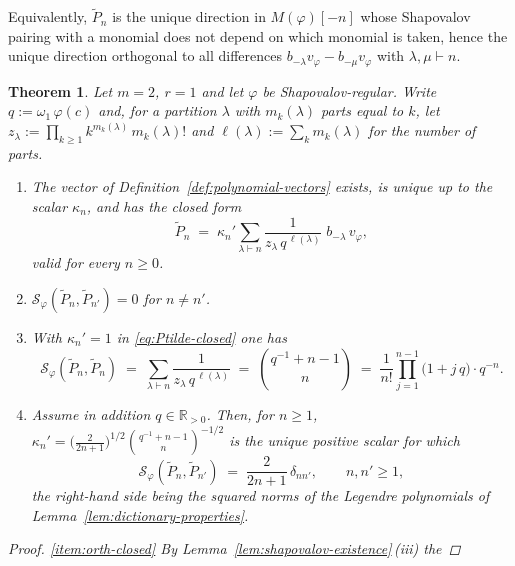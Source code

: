 \documentclass[12pt]{amsart}
\theoremstyle{plain}
\newtheorem{theorem}{Theorem}[section]
\theoremstyle{definition}
\newcommand{\RR}{\mathbb{R}}
\newcommand{\Mf}{M(\varphi)}          %
\newcommand{\Sf}{\mathcal{S}_\varphi} %
\newcommand{\vf}{v_\varphi}           %
\begin{document}
Equivalently, $\tilde{P}_n$ is the unique direction in $\Mf[-n]$ whose
Shapovalov pairing with a monomial does not depend on which monomial is
taken, hence the unique direction orthogonal to all differences
$b_{-\lambda}\vf - b_{-\mu}\vf$ with $\lambda,\mu \vdash n$. 

\begin{theorem}
\label{thm:shapovalov-orthogonality}
Let $m = 2$, $r = 1$ and let $\varphi$ be Shapovalov-regular. Write
$q := \omega_1\,\varphi(c)$ and, for a partition $\lambda$ with $m_k(\lambda)$
parts equal to $k$, let $z_\lambda := \prod_{k\ge 1} k^{m_k(\lambda)}\,m_k(\lambda)!$
and $\ell(\lambda) := \sum_k m_k(\lambda)$ for the number of parts.
\begin{enumerate}[label=\textup{(\roman*)}]
  \item\label{item:orth-closed}
    The vector of Definition~\textup{\ref{def:polynomial-vectors}} exists,
    is unique up to the scalar $\kappa_n$, and has the closed form
    \begin{equation}\label{eq:Ptilde-closed}
      \tilde{P}_n \;=\; \kappa_n' \sum_{\lambda \vdash n}
        \frac{1}{z_\lambda\,q^{\,\ell(\lambda)}}\; b_{-\lambda}\,\vf ,
    \end{equation}
    valid for every $n \geq 0$.
  \item\label{item:orth-weight}
    $\Sf(\tilde{P}_n, \tilde{P}_{n'}) = 0$ for $n \neq n'$.
  \item\label{item:orth-norm}
    With $\kappa_n' = 1$ in \eqref{eq:Ptilde-closed} one has
    \begin{equation}\label{eq:Ptilde-norm}
      \Sf(\tilde{P}_n, \tilde{P}_n)
      \;=\; \sum_{\lambda \vdash n} \frac{1}{z_\lambda\,q^{\,\ell(\lambda)}}
      \;=\; \binom{q^{-1} + n - 1}{n}
      \;=\; \frac{1}{n!}\prod_{j=1}^{n-1}\bigl(1 + j\,q\bigr) \cdot q^{-n}.
    \end{equation}
  \item\label{item:orth-classical}
    Assume in addition $q \in \RR_{>0}$. Then, for $n \geq 1$,
    $\kappa_n' = \bigl(\tfrac{2}{2n+1}\bigr)^{1/2}
      \binom{q^{-1}+n-1}{n}^{-1/2}$
    is the unique positive scalar for which
    \[
      \Sf(\tilde{P}_n, \tilde{P}_{n'}) \;=\; \frac{2}{2n+1}\,\delta_{n n'},
      \qquad n,n' \geq 1,
    \]
    the right-hand side being the squared norms of the Legendre
    polynomials of Lemma~\textup{\ref{lem:dictionary-properties}}. 
\end{enumerate}
\begin{proof}
\ref{item:orth-closed} By Lemma~\ref{lem:shapovalov-existence}\,(iii) the

\end{proof}
\end{theorem}
\end{document}
